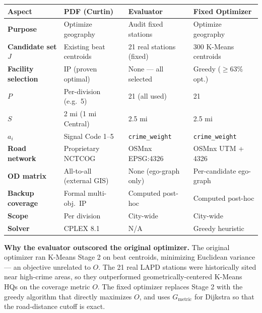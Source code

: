 \documentclass[11pt]{article}
\begin{document}
\renewcommand{\arraystretch}{1.35}
\begin{tabularx}{\textwidth}{@{} l X X X @{}}
\toprule
\textbf{Aspect} & \textbf{PDF (Curtin)} & \textbf{Evaluator} & \textbf{Fixed Optimizer} \\
\midrule
\textbf{Purpose} & Optimize geography & Audit fixed stations & Optimize geography \\
\textbf{Candidate set $J$} & Existing beat centroids & 21 real stations (fixed) & 300 K-Means centroids \\
\textbf{Facility selection} & IP (proven optimal) & None — all selected & Greedy ($\ge 63\%$ opt.) \\
\textbf{$P$} & Per-division (e.g.\ 5) & 21 (all used) & 21 \\
\textbf{$S$} & 2 mi (1 mi Central) & 2.5 mi & 2.5 mi \\
\textbf{$a_i$} & Signal Code 1--5 & \texttt{crime\_weight} & \texttt{crime\_weight} \\
\textbf{Road network} & Proprietary NCTCOG & OSMnx EPSG:4326 & OSMnx UTM + 4326 \\
\textbf{OD matrix} & All-to-all (external GIS) & None (ego-graph only) & Per-candidate ego-graph \\
\textbf{Backup coverage} & Formal multi-obj.\ IP & Computed post-hoc & Computed post-hoc \\
\textbf{Scope} & Per division & City-wide & City-wide \\
\textbf{Solver} & CPLEX 8.1 & N/A & Greedy heuristic \\
\bottomrule
\end{tabularx}

\bigskip
\noindent\textbf{Why the evaluator outscored the original optimizer.}
The original optimizer ran K-Means Stage 2 on beat centroids, minimizing Euclidean
variance — an objective unrelated to $O$. The 21 real LAPD stations were
historically sited near high-crime areas, so they outperformed geometrically-centered
K-Means HQs on the coverage metric $O$. The fixed optimizer replaces Stage 2
with the greedy algorithm that directly maximizes $O$, and uses $G_\text{metric}$
for Dijkstra so that the road-distance cutoff is exact.
\end{document}
